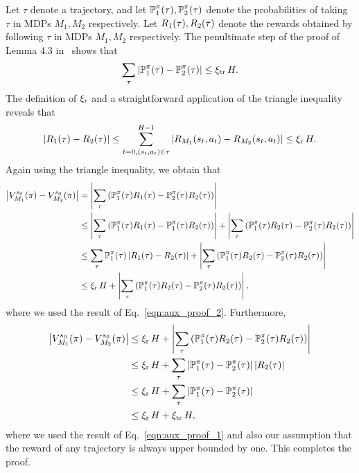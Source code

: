 \documentclass[11pt,twoside]{article}
\begin{document}
Let $\tau$ denote a trajectory, and let $\operatorname{\mathbb{P}}_1^{\pi}(\tau), \operatorname{\mathbb{P}}_2^{\pi}(\tau)$ denote the probabilities of taking $\tau$ in MDPs $M_1, M_2$ respectively. Let $R_1(\tau), R_2(\tau)$ denote the rewards obtained by following $\tau$ in MDPs $M_1, M_2$ respectively. The penultimate step of the proof of Lemma 4.3 in~\citep{kakade03} shows that
\begin{equation}
\label{eqn:aux_proof_1}
\sum_{\tau} \left \vert \operatorname{\mathbb{P}}_1^{\pi}(\tau) - \operatorname{\mathbb{P}}_2^{\pi}(\tau) \right \vert \leq \operatorname{\xi_{tr}} H.
\end{equation}
The definition of $\operatorname{\xi_r}$ and a straightforward application of the triangle inequality reveals that
\begin{equation}
\label{eqn:aux_proof_2}
\left \vert R_1(\tau) - R_2(\tau) \right \vert \leq \sum_{t = 0, (s_t, a_t) \in \tau}^{H-1} \left \vert R_{M_1}(s_t, a_t) - R_{M_2}(s_t, a_t) \right \vert \leq \operatorname{\xi_r} H.
\end{equation}
Again using the triangle inequality, we obtain that
\begin{align*}
\left \vert V^{{s_0 }}_{{M_1 }}({\pi}) - V^{{s_0 }}_{{M_2 }}({\pi}) \right \vert &= \left \vert \sum_{\tau} \left( \operatorname{\mathbb{P}}_1^{\pi}(\tau) R_1(\tau) - \operatorname{\mathbb{P}}_2^{\pi}(\tau) R_2(\tau) \right) \right \vert \\
&\leq \left \vert \sum_{\tau} \left( \operatorname{\mathbb{P}}_1^{\pi}(\tau) R_1(\tau) - \operatorname{\mathbb{P}}_1^{\pi}(\tau) R_2(\tau) \right) \right \vert + \left \vert \sum_{\tau} \left( \operatorname{\mathbb{P}}_1^{\pi}(\tau) R_2(\tau) - \operatorname{\mathbb{P}}_2^{\pi}(\tau) R_2(\tau) \right) \right \vert \\
&\leq \sum_{\tau} \operatorname{\mathbb{P}}_1^{\pi}(\tau) \left \vert R_1(\tau) - R_2(\tau) \right \vert + \left \vert \sum_{\tau} \left( \operatorname{\mathbb{P}}_1^{\pi}(\tau) R_2(\tau) - \operatorname{\mathbb{P}}_2^{\pi}(\tau) R_2(\tau) \right) \right \vert \\
&\leq \operatorname{\xi_r} H + \left \vert \sum_{\tau} \left( \operatorname{\mathbb{P}}_1^{\pi}(\tau) R_2(\tau) - \operatorname{\mathbb{P}}_2^{\pi}(\tau) R_2(\tau) \right) \right \vert,
\end{align*}
where we used the result of Eq.~\eqref{eqn:aux_proof_2}. Furthermore,
\begin{align*}
\left \vert V^{{s_0 }}_{{M_1 }}({\pi}) - V^{{s_0 }}_{{M_2 }}({\pi}) \right \vert &\leq \operatorname{\xi_r} H + \left \vert \sum_{\tau} \left( \operatorname{\mathbb{P}}_1^{\pi}(\tau) R_2(\tau) - \operatorname{\mathbb{P}}_2^{\pi}(\tau) R_2(\tau) \right) \right \vert \\
&\leq \operatorname{\xi_r} H + \sum_{\tau} \left \vert \operatorname{\mathbb{P}}_1^{\pi}(\tau)  - \operatorname{\mathbb{P}}_2^{\pi}(\tau) \right \vert \left \vert R_2(\tau) \right \vert \\
&\leq \operatorname{\xi_r} H + \sum_{\tau} \left \vert \operatorname{\mathbb{P}}_1^{\pi}(\tau)  - \operatorname{\mathbb{P}}_2^{\pi}(\tau) \right \vert \\
&\leq \operatorname{\xi_r} H + \operatorname{\xi_{tr}} H,
\end{align*}
where we used the result of Eq.~\eqref{eqn:aux_proof_1} and also our assumption that the reward of any trajectory is always upper bounded by one. This completes the proof.











\end{document}
